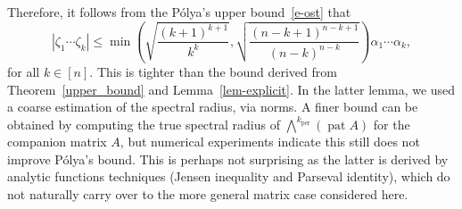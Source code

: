 \documentclass[a4paper]{amsart}
\theoremstyle{definition}
\theoremstyle{plain}
\theoremstyle{remark}
\begin{document}
Therefore, it follows from the P\'olya's upper bound~\eqref{e-ost} that
 \[
  |\zeta_1 \dotsm \zeta_k| {\leqslant} \min\left(\sqrt{\frac{{(k+1)}^{k+1}}{k^k}},
  \sqrt{\frac{{(n-k+1)}^{n-k+1}}{{(n-k)}^{n-k}}} \right) \alpha_1 \dotsm \alpha_k,
 \]
 for all $k \in [n]$.
This is tighter than the bound derived from Theorem~\ref{upper_bound}
and Lemma~\ref{lem-explicit}. In the latter lemma, we used
a coarse estimation of the spectral radius, via norms. A finer
bound can be obtained by computing the true
spectral radius of ${\mbox{$\bigwedge$}}^k_\operatorname{per} (\operatorname{pat} A)$ for the companion matrix $A$,
but numerical experiments indicate this still does not improve P\'olya's bound. This is perhaps not
surprising as the latter is derived by analytic functions techniques 
(Jensen inequality and Parseval identity), which do not naturally
carry over to the more general matrix case considered here.
\end{document}
